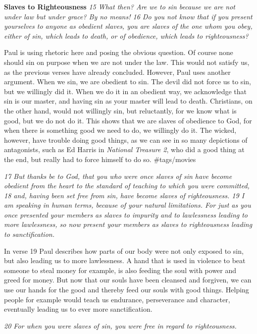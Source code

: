 \textbf{Slaves to Righteousness} \emph{15 What then? Are we to sin
because we are not under law but under grace? By no means! 16 Do you not
know that if you present yourselves to anyone as obedient slaves, you
are slaves of the one whom you obey, either of sin, which leads to
death, or of obedience, which leads to righteousness?}

Paul is using rhetoric here and posing the obvious question. Of course
none should sin on purpose when we are not under the law. This would not
satisfy us, as the previous verses have already concluded. However, Paul
uses another argument. When we sin, we are obedient to sin. The devil
did not force us to sin, but we willingly did it. When we do it in an
obedient way, we acknowledge that sin is our master, and having sin as
your master will lead to death. Christians, on the other hand, would not
willingly sin, but reluctantly, for we know what is good, but we do not
do it. This shows that we are slaves of obedience to God, for when there
is something good we need to do, we willingly do it. The wicked,
however, have trouble doing good things, as we can see in so many
depictions of antagonists, such as Ed Harris in \emph{National Treasure
2}, who did a good thing at the end, but really had to force himself to
do so. \#tags/movies

\emph{17 But thanks be to God, that you who were once slaves of sin have
become obedient from the heart to the standard of teaching to which you
were committed, 18 and, having been set free from sin, have become
slaves of righteousness. 19 I am speaking in human terms, because of
your natural limitations. For just as you once presented your members as
slaves to impurity and to lawlessness leading to more lawlessness, so
now present your members as slaves to righteousness leading to
sanctification.}

In verse 19 Paul describes how parts of our body were not only exposed
to sin, but also leading us to more lawlessness. A hand that is used in
violence to beat someone to steal money for example, is also feeding the
soul with power and greed for money. But now that our souls have been
cleansed and forgiven, we can use our hands for the good and thereby
feed our souls with good things. Helping people for example would teach
us endurance, perseverance and character, eventually leading us to ever
more sanctification.

\emph{20 For when you were slaves of sin, you were free in regard to
righteousness.}

